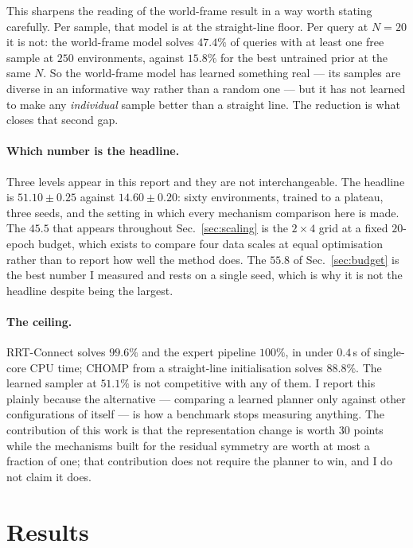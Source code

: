 \documentclass[11pt,a4paper]{article}
\begin{document}
This sharpens the reading of the world-frame result in a way worth stating
carefully. Per sample, that model is at the straight-line floor. Per query at
$N = 20$ it is not: the world-frame model solves $47.4\%$ of queries with at
least one free sample at $250$ environments, against $15.8\%$ for the best
untrained prior at the same $N$. So the world-frame model has learned something
real --- its samples are diverse in an informative way rather than a random one
--- but it has not learned to make any \emph{individual} sample better than a
straight line. The reduction is what closes that second gap.

\paragraph{Which number is the headline.} Three levels appear in this report and
they are not interchangeable. The headline is $51.10 \pm 0.25$ against
$14.60 \pm 0.20$: sixty environments, trained to a plateau, three seeds, and the
setting in which every mechanism comparison here is made. The $45.5$ that appears
throughout Sec.~\ref{sec:scaling} is the $2\times4$ grid at a fixed $20$-epoch
budget, which exists to compare four data scales at equal optimisation rather
than to report how well the method does. The $55.8$ of Sec.~\ref{sec:budget} is
the best number I measured and rests on a single seed, which is why it is not the
headline despite being the largest.

\paragraph{The ceiling.} RRT-Connect solves $99.6\%$ and the expert pipeline
$100\%$, in under $0.4$\,s of single-core CPU time; CHOMP from a straight-line
initialisation solves $88.8\%$. The learned sampler at $51.1\%$ is not
competitive with any of them. I report this plainly because the alternative ---
comparing a learned planner only against other configurations of itself --- is
how a benchmark stops measuring anything. The contribution of this work is that
the representation change is worth $30$ points while the mechanisms built for the
residual symmetry are worth at most a fraction of one; that contribution does not
require the planner to win, and I do not claim it does.

\section{Results}
\end{document}
